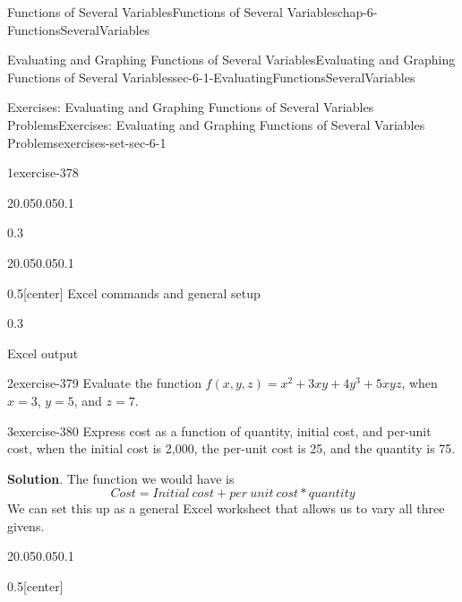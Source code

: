 \documentclass[oneside,10pt,]{book}
\numberwithin{equation}{section}
\begin{document}
\begin{chapterptx}{Functions of Several Variables}{}{Functions of Several Variables}{}{}{chap-6-FunctionsSeveralVariables}
\begin{sectionptx}{Evaluating and Graphing Functions of Several Variables}{}{Evaluating and Graphing Functions of Several Variables}{}{}{sec-6-1-EvaluatingFunctionsSeveralVariables}
\begin{exercises-subsection-numberless}{Exercises: Evaluating and Graphing Functions of Several Variables Problems}{}{Exercises: Evaluating and Graphing Functions of Several Variables Problems}{}{}{exercises-set-sec-6-1}
\begin{exercisegroup}
\begin{divisionexerciseeg}{1}{}{}{exercise-378}
\begin{sidebyside}{2}{0.05}{0.05}{0.1}
\begin{sbspanel}{0.3}
\end{sbspanel}%
\end{sidebyside}%
\begin{sidebyside}{2}{0.05}{0.05}{0.1}%
\begin{sbspanel}{0.5}[center]%
\hypertarget{p-2149}{}%
Excel commands  and general setup%
\end{sbspanel}%
\begin{sbspanel}{0.3}%
\par
\hypertarget{p-2150}{}%
Excel output%
\end{sbspanel}%
\end{sidebyside}%
\end{divisionexerciseeg}%
\begin{divisionexerciseeg}{2}{}{}{exercise-379}%
\hypertarget{p-2151}{}%
Evaluate the function \(f(x,y,z)=x^2+3xy+4y^3+5xyz\), when \(x=3\), \(y=5\), and \(z=7\).%
\end{divisionexerciseeg}%
\begin{divisionexerciseeg}{3}{}{}{exercise-380}%
\hypertarget{p-2152}{}%
Express cost as a function of quantity, initial cost, and per-unit cost, when the initial cost is \textdollar{}2,000, the per-unit cost is \textdollar{}25, and the quantity is 75.%
\par\smallskip%
\noindent\textbf{Solution}.\hypertarget{solution-191}{}\quad%
\hypertarget{p-2153}{}%
The function we would have is%
%
\begin{equation*}
Cost=Initial\ cost+per\ unit\ cost*quantity
\end{equation*}
\hypertarget{p-2154}{}%
We can set this up as a general Excel worksheet that allows us to vary all three givens.%
\begin{sidebyside}{2}{0.05}{0.05}{0.1}%
\begin{sbspanel}{0.5}[center]%

\end{sbspanel}
\end{sidebyside}
\end{divisionexerciseeg}
\end{exercisegroup}
\end{exercises-subsection-numberless}
\end{sectionptx}
\end{chapterptx}
\end{document}
